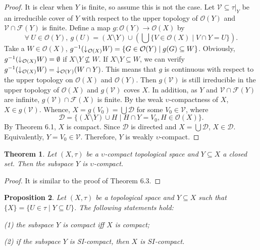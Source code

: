 \documentclass[preprint,12pt]{elsarticle}
\numberwithin{equation}{section}
\newtheorem{theorem}{Theorem}[section]
\newtheorem{proposition}[theorem]{Proposition}
\newcommand{\dn}{\mathord{\downarrow}\hspace{0.05em}}
\begin{document}
\begin{proof}It is clear when $Y$ is finite, so assume this is not the case. Let $\mathcal{V}\subseteq\tau|_{Y}$ be an irreducible cover of $Y$ with respect to the upper topology of $\mathcal{O}(Y)$ and $\mathcal{V}\cap\mathscr{F}(Y)$ is finite. Define a map $g:\mathcal{O}(Y)\longrightarrow\mathcal{O}(X)$ by
$$\forall\ U\in\mathcal{O}(Y),\ g(U)=(X\setminus Y)\cup(\bigcup\{V\in\mathcal{O}(X)\mid V\cap Y=U\}).$$
Take a $W\in\mathcal{O}(X)$, $g^{-1}(\dn_{\mathcal{O}(X)}W)=\{G\in\mathcal{O}(Y)\mid g(G)\subseteq W\}$. Obviously, $g^{-1}(\dn_{\mathcal{O}(X)}W)=\emptyset$ if $X\setminus Y\not\subseteq W$. If $X\setminus Y\subseteq W$, we can verify  $g^{-1}(\dn_{\mathcal{O}(X)}W)=\dn_{\mathcal{O}(Y)}(W\cap Y)$. This means that $g$ is continuous with respect to the upper topology on $\mathcal{O}(X)$ and $\mathcal{O}(Y)$. Then $g(\mathcal{V})$ is still irreducible in the upper topology of $\mathcal{O}(X)$ and $g(\mathcal{V})$ coves $X$. In addition, as $Y$ and $\mathcal{V}\cap\mathscr{F}(Y)$ are infinite, $g(\mathcal{V})\cap\mathscr{F}(X)$ is finite. By the weak $\upsilon$-compactness of $X$, $X\in g(\mathcal{V})$. Whence, $X=g(V_{0})=\bigcup\mathcal{D}$ for some $V_{0}\in\mathcal{V}$, where $$\mathcal{D}=\{(X\setminus Y)\cup H\mid H\cap Y=V_{0}, H\in\mathcal{O}(X)\}.$$ By Theorem 6.1, $X$ is compact. Since $\mathcal{D}$ is directed and $X=\bigcup\mathcal{D}$, $X\in\mathcal{D}$. Equivalently, $Y=V_{0}\in\mathcal{V}$. Therefore, $Y$ is weakly $\upsilon$-compact.\end{proof}

\begin{theorem}Let $(X,\tau)$ be a $\upsilon$-compact topological space and $Y\subseteq X$ a closed set. Then the subspace $Y$ is  $\upsilon$-compact.
\end{theorem}
\begin{proof}It is similar to the proof of Theorem 6.3.\end{proof}

\begin{proposition} Let $(X,\tau)$ be a topological space and $Y\subseteq X$ such that $\{X\}=\{U\in\tau\mid Y\subseteq U\}$. The following statements hold:

{\rm(1)}  the subspace $Y$ is compact iff $X$ is compact;

{\rm(2)} if the subspace $Y$ is SI-compact, then $X$ is $SI$-compact.

\end{proposition}
\end{document}
